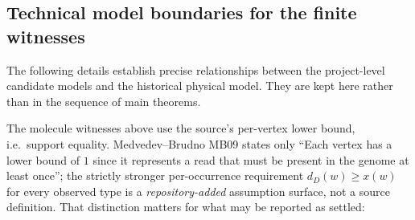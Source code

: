 \subsection{Technical model boundaries for the finite witnesses}
\label{app:finite-domain-boundaries}

The following details establish precise relationships between the
project-level candidate models and the historical physical model.
They are kept here rather than in the sequence of main theorems.

\begin{remark}
\label{rem:surfaces}
The molecule witnesses above use the source's per-vertex lower bound, i.e.\
support equality. Medvedev--Brudno MB09 states only ``Each vertex has a lower
bound of $1$ since it represents a read that must be present in the genome at
least once''; the strictly stronger per-occurrence requirement $d_D(w)\ge x(w)$
for every observed type is a \emph{repository-added} assumption surface, not a
source definition. That distinction matters for what may be reported as
settled:


\end{remark}
